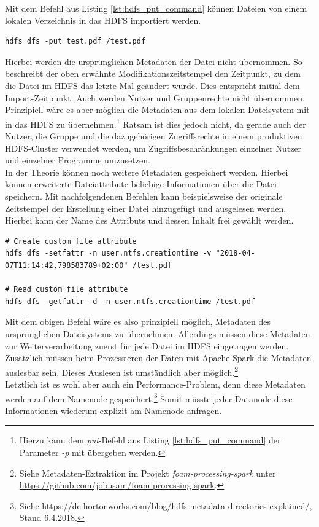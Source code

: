 \noindent
Mit dem Befehl aus Listing \ref{lst:hdfs_put_command} können Dateien von einem lokalen Verzeichnis in das HDFS importiert werden. 
\begin{lstlisting}[label={lst:hdfs_put_command},caption= Befehl zum Speichern einer Datei im HDFS,captionpos=b,frame=single,style=customshell]
hdfs dfs -put test.pdf /test.pdf
\end{lstlisting}
Hierbei werden die ursprünglichen Metadaten der Datei nicht übernommen. So beschreibt der oben erwähnte Modifikationszeitstempel den Zeitpunkt, zu dem die Datei im HDFS das letzte Mal geändert wurde. Dies entspricht initial dem Import-Zeitpunkt. Auch werden Nutzer und Gruppenrechte nicht übernommen. Prinzipiell wäre es aber möglich die Metadaten aus dem lokalen Dateisystem mit in das HDFS zu übernehmen.\footnote{Hierzu kann dem \textit{put}-Befehl aus Listing \ref{lst:hdfs_put_command} der Parameter \textit{-p} mit übergeben werden.} Ratsam ist dies jedoch nicht, da gerade auch der Nutzer, die Gruppe und die dazugehörigen Zugriffsrechte in einem produktiven HDFS-Cluster verwendet werden, um Zugriffsbeschränkungen einzelner Nutzer und einzelner Programme umzusetzen.\\

\noindent
In der Theorie können noch weitere Metadaten gespeichert werden. Hierbei können erweiterte Dateiattribute beliebige Informationen über die Datei speichern. Mit nachfolgendenen Befehlen kann beispielsweise der originale Zeitstempel der Erstellung einer Datei hinzugefügt und ausgelesen werden. Hierbei kann der Name des Attributs und dessen Inhalt frei gewählt werden.
\begin{lstlisting}[label={lst:hdfs_fattr_command},caption= Befehl zum Hinzufügen und Auslesen von Metadaten,captionpos=b,frame=single,style=customshell]
# Create custom file attribute
hdfs dfs -setfattr -n user.ntfs.creationtime -v "2018-04-07T11:14:42,798583789+02:00" /test.pdf

# Read custom file attribute
hdfs dfs -getfattr -d -n user.ntfs.creationtime /test.pdf
\end{lstlisting}

\noindent
Mit dem obigen Befehl wäre es also prinzipiell möglich, Metadaten des ursprünglichen Dateisystems zu übernehmen. Allerdings müssen diese Metadaten zur Weiterverarbeitung zuerst für jede Datei im HDFS eingetragen werden.\\
Zusätzlich müssen beim Prozessieren der Daten mit Apache Spark die Metadaten auslesbar sein. Dieses Auslesen ist umständlich aber möglich.\footnote{Siehe Metadaten-Extraktion im Projekt \textit{foam-processing-spark} unter \url{https://github.com/jobusam/foam-processing-spark}.}\\ 
Letztlich ist es wohl aber auch ein Performance-Problem, denn diese Metadaten werden auf dem Namenode gespeichert.\footnote{Siehe \url{https://de.hortonworks.com/blog/hdfs-metadata-directories-explained/}, Stand 6.4.2018.} Somit müsste jeder Datanode diese Informationen wiederum explizit am Namenode anfragen.\\

